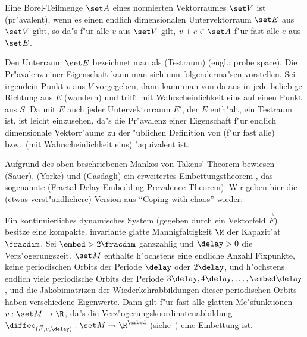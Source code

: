 \begin{definition}
Eine Borel-Teilmenge $\set A$ eines normierten Vektorraumes $\set V$ ist \begriff(pr"avalent), wenn
es einen endlich dimensionalen Untervektorraum $\set E$ aus $\set V$ gibt, so da"s f"ur alle $v$ aus
$\set V$ gilt, $v+e\in \set A$ f"ur fast alle $e$ aus $\set E$.
\end{definition}
Den Unterraum $\set E$ bezeichnet man als \begriff(Testraum) (engl.: probe space). Die Pr"avalenz
einer Eigenschaft  kann man sich nun folgenderma"sen vorstellen. Sei irgendein
Punkt $v$ aus $V$ vorgegeben, dann kann man von da aus in jede beliebige Richtung aus $E$
\naja(wandern) und trifft mit Wahrscheinlichkeit eins auf einen Punkt aus $S$. Da mit $E$
auch jeder Untervektorraum $E'$, der $E$ enth"alt, ein Testraum ist, ist leicht
einzusehen, da"s die Pr"avalenz einer Eigenschaft f"ur endlich dimensionale Vektorr"aume zu
der "ublichen Definition von \naja(f"ur fast alle) bzw.\ \naja(mit Wahrscheinlichkeit
eins) "aquivalent ist.


Aufgrund des oben beschriebenen Mankos von Takens' Theorem bewiesen \autor(Sauer),
\autor(Yorke) und \autor(Casdagli) ein erweitertes Einbettungstheorem \cite{Sauer91}, das
sogenannte \begriff(Fractal Delay Embedding Prevalence Theorem). Wir geben hier die (etwas 
verst"andlichere) Version aus ``Coping with chaos'' \cite{Ott94} wieder:

\begin{theorem}
  Ein kontinuierliches dynamisches System (gegeben durch ein Vektorfeld $\vec F$) besitze
  eine kompakte, invariante glatte Mannigfaltigkeit $\M$ der Kapazit"at $\fracdim$. 
  Sei $\embed>2\fracdim$ ganzzahlig und $\delay>0$ die Verz"ogerungszeit.  $\set M$ enthalte h"ochstens
  eine endliche Anzahl Fixpunkte, keine periodischen Orbits der Periode $\delay$ oder
  $2\delay$, und h"ochstens endlich viele periodische Orbits der Periode
  $3\delay,4\delay,\dots,\embed\delay$, und die Jakobimatrizen der Wiederkehrabbildungen dieser
  periodischen Orbits haben verschiedene Eigenwerte.  Dann gilt f"ur fast alle glatten
  Me"sfunktionen $v:\set M\to\R$, da"s die Verz"ogerungskoordinatenabbildung
  $\diffeo_{(\vec F,v,\delay)}:\set M\to\R^\embed$ (siehe~) eine Einbettung ist.
\end{theorem}


